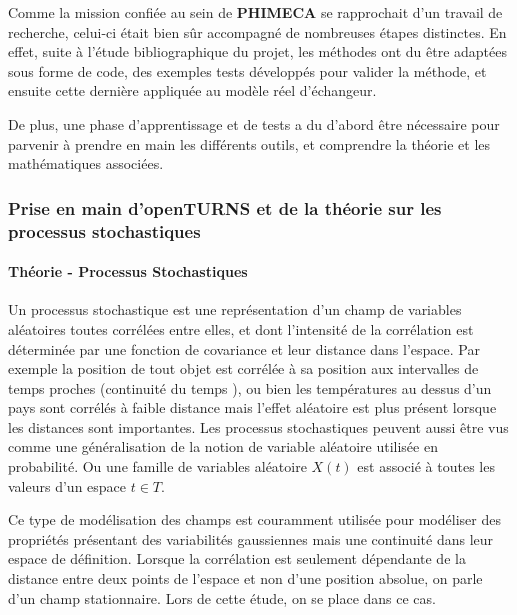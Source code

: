 \documentclass[a4paper,10pt]{article}
\begin{document}
Comme la mission confiée au sein de \textbf{PHIMECA} se rapprochait d'un travail de recherche, celui-ci était bien sûr accompagné de nombreuses étapes distinctes. En effet, suite à l'étude bibliographique du projet, les méthodes ont du être adaptées sous forme de code, des exemples tests développés pour valider la méthode, et ensuite cette dernière appliquée au modèle réel d'échangeur. \par 
De plus, une phase d'apprentissage et de tests a du d'abord être nécessaire pour parvenir à prendre en main les différents outils, et comprendre la théorie et les mathématiques associées. \par \smallskip

\subsubsection{Prise en main d'openTURNS et de la théorie sur les processus stochastiques}
\paragraph{Théorie - Processus Stochastiques} 
Un processus stochastique est une représentation d'un champ de variables aléatoires toutes corrélées entre elles, et dont l'intensité de la corrélation est déterminée par une fonction de covariance et leur distance dans l'espace. Par exemple la position de tout objet est corrélée à sa position aux intervalles de temps proches (continuité du temps ), ou bien les températures au dessus d'un pays sont corrélés à faible distance mais l'effet aléatoire est plus présent lorsque les distances sont importantes. \smallskip
Les processus stochastiques peuvent aussi être vus comme une généralisation de la notion de variable aléatoire utilisée en probabilité. Ou une famille de variables aléatoire $X(t)$ est associé à toutes les valeurs d'un espace $t \in T$. \par \smallskip
Ce type de modélisation des champs est couramment utilisée pour modéliser des propriétés présentant des variabilités gaussiennes mais une continuité dans leur espace de définition. 
Lorsque la corrélation est seulement dépendante de la distance entre deux points de l'espace et non d'une position absolue, on parle d'un champ stationnaire. Lors de cette étude, on se place dans ce cas. \par \smallskip
\end{document}
